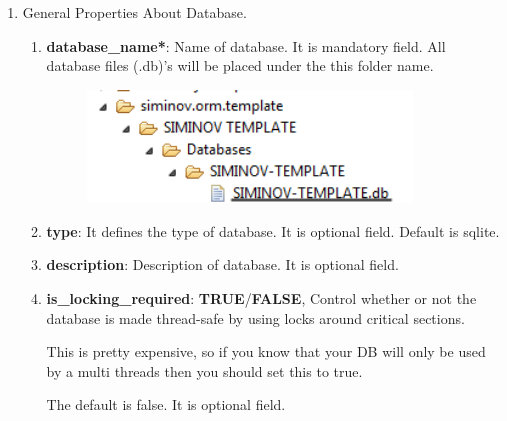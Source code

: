 \begin{enumerate}

	\item \small General Properties About Database.

		\begin{enumerate}

			\item \small \textbf{database\_name*}: Name of database. It is mandatory field. All database files (.db)'s will be placed under the this folder name.

			\begin{figure}[htbp]
				\centering
					\includegraphics[height=3cm]{Resources/siminov_template_application_data_folder_structure_for_database_name.png}
			\end{figure}

			\item \small \textbf{type}: It defines the type of database. It is optional field. Default is sqlite.

			\item \small \textbf{description}: Description of database. It is optional field.
			\item \small \textbf{is\_locking\_required}: \textbf{TRUE}/\textbf{FALSE}, Control whether or not the database is made thread-safe by using locks around critical sections. 
				
				\par
				This is pretty expensive, so if you know that your DB will only be used by a multi threads then you should set this to true. 

				\par
				The default is false. It is optional field. 
			
			\begin{center}
				\colorbox{grey}{
					\parbox[t]{.8\linewidth}{
						\fontsize{11pt}{11pt}\selectfont %
						\vspace*{0.1cm} %
		
}}
\end{center}
\end{enumerate}
\end{enumerate}
